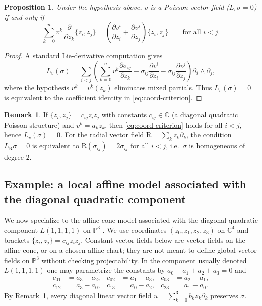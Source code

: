 \documentclass[11pt]{amsart}
\theoremstyle{plain}
\newtheorem{proposition}[theorem]{Proposition}
\theoremstyle{definition}
\newtheorem{remark}[theorem]{Remark}
\theoremstyle{definition}
\begin{document}
\begin{proposition}\label{prop:coord-criterion}
Under the hypothesis above, $v$ is a Poisson vector field ($L_v\sigma=0$) if and only if
\begin{equation}\label{eq:coord-criterion}
\sum_{k=0}^n v^k\,\frac{\partial}{\partial z_k}\{z_i,z_j\}
=
\left(\frac{\partial v^i}{\partial z_i}+\frac{\partial v^j}{\partial z_j}\right)\{z_i,z_j\}
\qquad\text{for all } i<j.
\end{equation}
\end{proposition}

\begin{proof}
A standard Lie-derivative computation gives
$$
L_v(\sigma)=\sum_{i<j}\left(
\sum_{k=0}^n v^k\frac{\partial\sigma_{ij}}{\partial z_k}
-\sigma_{ij}\frac{\partial v^i}{\partial z_i}
-\sigma_{ij}\frac{\partial v^j}{\partial z_j}
\right)\partial_i\wedge\partial_j,
$$
where the hypothesis $v^k=v^k(z_k)$ eliminates mixed partials.
Thus $L_v(\sigma)=0$ is equivalent to the coefficient identity in \eqref{eq:coord-criterion}.
\end{proof}

\begin{remark} \label{rem:diag-quad}
 If $\{z_i,z_j\}=c_{ij}z_iz_j$ with constants $c_{ij}\in\mathbb C$ (a diagonal quadratic Poisson structure) and
$v^k=a_k z_k$, then \eqref{eq:coord-criterion} holds for all $i<j$, hence $L_v(\sigma)=0$.
 For the radial vector field $\mathrm R=\sum_k z_k\partial_k$, the condition $L_{\mathrm R}\sigma=0$ is
equivalent to $\mathrm R(\sigma_{ij})=2\sigma_{ij}$ for all $i<j$, i.e.\ $\sigma$ is homogeneous of degree $2$.
\end{remark}

\subsection{Example: a local affine model associated with the diagonal quadratic component}

We now specialize to the affine cone model associated with the diagonal quadratic component $L(1,1,1,1)$ on $\mathbb P^3$ \cite{Pym18}. We use coordinates $(z_0,z_1,z_2,z_3)$ on $\mathbb C^4$ and brackets $\{z_i,z_j\}=c_{ij}z_iz_j$. Constant vector fields below are vector fields on the affine cone, or on a chosen affine chart; they are not meant to define global vector fields on $\mathbb P^3$ without checking projectability.
In the component usually denoted $L(1,1,1,1)$ one may parametrize the constants by
$a_0+a_1+a_2+a_3=0$ and
\begin{align*}
c_{01}&=a_3-a_2, & c_{02}&=a_1-a_3, & c_{03}&=a_2-a_1,\\
c_{12}&=a_3-a_0, & c_{13}&=a_0-a_2, & c_{23}&=a_1-a_0.
\end{align*}
By Remark~\ref{rem:diag-quad}, every diagonal linear vector field
$u=\sum_{k=0}^3 b_k z_k\partial_k$ preserves $\sigma$.
\end{document}
